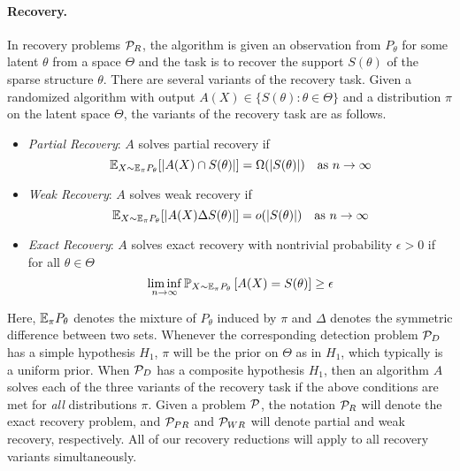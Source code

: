\paragraph{Recovery.} In recovery problems $\mathcal{P}_R$, the algorithm is given an observation from $P_\theta$ for some latent $\theta$ from a space $\Theta$ and the task is to recover the support $S(\theta)$ of the sparse structure $\theta$. There are several variants of the recovery task. Given a randomized algorithm with output $A(X) \in \{ S(\theta) : \theta \in \Theta \}$ and a distribution $\pi$ on the latent space $\Theta$, the variants of the recovery task are as follows.
\begin{itemize}
\item \textit{Partial Recovery}: $A$ solves partial recovery if
$$\mathbb{E}_{X \sim \mathbb{E}_\pi P_\theta}[|A(X) \cap S(\theta)|] = \Omega(|S(\theta)|) \quad \text{as } n \to \infty$$
\item \textit{Weak Recovery}: $A$ solves weak recovery if
$$\mathbb{E}_{X \sim \mathbb{E}_\pi P_\theta}[|A(X) \Delta S(\theta)|] = o(|S(\theta)|) \quad \text{as } n \to \infty$$
\item \textit{Exact Recovery}: $A$ solves exact recovery with nontrivial probability $\epsilon > 0$ if for all $\theta \in \Theta$
$$\liminf_{n \to \infty} \mathbb{P}_{X \sim \mathbb{E}_\pi P_\theta} \left[ A(X) = S(\theta) \right] \ge \epsilon$$
\end{itemize}
Here, $\mathbb{E}_\pi P_\theta$ denotes the mixture of $P_\theta$ induced by $\pi$ and $\Delta$ denotes the symmetric difference between two sets. Whenever the corresponding detection problem $\mathcal{P}_D$ has a simple hypothesis $H_1$, $\pi$ will be the prior on $\Theta$ as in $H_1$, which typically is a uniform prior. When $\mathcal{P}_D$ has a composite hypothesis $H_1$, then an algorithm $A$ solves each of the three variants of the recovery task if the above conditions are met for \emph{all} distributions $\pi$.
Given a problem $\mathcal{P}$, the notation $\mathcal{P}_R$ will denote the exact recovery problem, and $\mathcal{P}_{PR}$ and $\mathcal{P}_{WR}$ will denote partial and weak recovery, respectively. All of our recovery reductions will apply to all recovery variants simultaneously.

